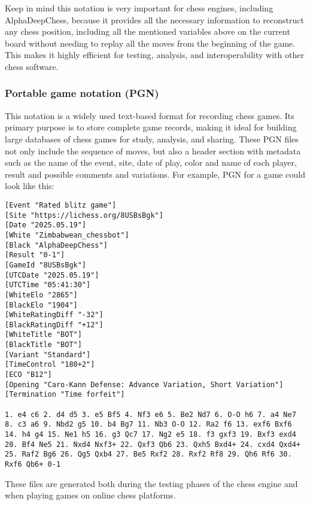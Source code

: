\noindent Keep in mind this notation is very important for chess engines, including AlphaDeepChess, because it provides all the necessary information to reconstruct any chess position, including all the mentioned variables above on the current board without needing to replay all the moves from the beginning of the game. This makes it highly efficient for testing, analysis, and interoperability with other chess software.

\subsubsection*{Portable game notation (PGN)}

This notation is a widely used text-based format for recording chess games. Its primary purpose is to store complete game records, making it ideal for building large databases of chess games for study, analysis, and sharing. These PGN files not only include the sequence of moves, but also a header section with metadata such as the name of the event, site, date of play, color and name of each player, result and possible comments and variations. For example, PGN for a game could look like this:

\vspace{1em}

\begin{lstlisting}[basicstyle=\ttfamily\small, captionpos=b, breaklines=true, frame=single, caption={Example of a PGN file}, label={lst:pgn-example}]
[Event "Rated blitz game"]
[Site "https://lichess.org/8USBsBgk"]
[Date "2025.05.19"]
[White "Zimbabwean_chessbot"]
[Black "AlphaDeepChess"]
[Result "0-1"]
[GameId "8USBsBgk"]
[UTCDate "2025.05.19"]
[UTCTime "05:41:30"]
[WhiteElo "2865"]
[BlackElo "1904"]
[WhiteRatingDiff "-32"]
[BlackRatingDiff "+12"]
[WhiteTitle "BOT"]
[BlackTitle "BOT"]
[Variant "Standard"]
[TimeControl "180+2"]
[ECO "B12"]
[Opening "Caro-Kann Defense: Advance Variation, Short Variation"]
[Termination "Time forfeit"]

1. e4 c6 2. d4 d5 3. e5 Bf5 4. Nf3 e6 5. Be2 Nd7 6. O-O h6 7. a4 Ne7 8. c3 a6 9. Nbd2 g5 10. b4 Bg7 11. Nb3 O-O 12. Ra2 f6 13. exf6 Bxf6 14. h4 g4 15. Ne1 h5 16. g3 Qc7 17. Ng2 e5 18. f3 gxf3 19. Bxf3 exd4 20. Bf4 Ne5 21. Nxd4 Nxf3+ 22. Qxf3 Qb6 23. Qxh5 Bxd4+ 24. cxd4 Qxd4+ 25. Raf2 Bg6 26. Qg5 Qxb4 27. Be5 Rxf2 28. Rxf2 Rf8 29. Qh6 Rf6 30. Rxf6 Qb6+ 0-1
\end{lstlisting}

These files are generated both during the testing phases of the chess engine and when playing games on online chess platforms.
